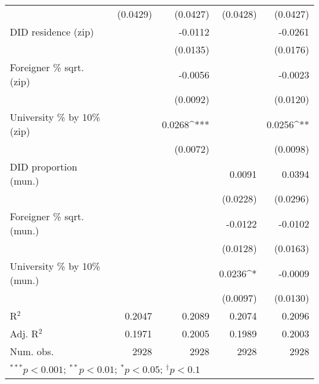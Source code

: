 \begin{tabular}{l D{.}{.}{4.11} D{.}{.}{4.11} D{.}{.}{4.11} D{.}{.}{4.11}}
                                  & (0.0429)          & (0.0427)          & (0.0428)          & (0.0427)          \\
DID residence (zip)               &                   & -0.0112           &                   & -0.0261           \\
                                  &                   & (0.0135)          &                   & (0.0176)          \\
Foreigner \% sqrt. (zip)          &                   & -0.0056           &                   & -0.0023           \\
                                  &                   & (0.0092)          &                   & (0.0120)          \\
University \% by 10\% (zip)       &                   & 0.0268^{***}      &                   & 0.0256^{**}       \\
                                  &                   & (0.0072)          &                   & (0.0098)          \\
DID proportion (mun.)             &                   &                   & 0.0091            & 0.0394            \\
                                  &                   &                   & (0.0228)          & (0.0296)          \\
Foreigner \% sqrt. (mun.)         &                   &                   & -0.0122           & -0.0102           \\
                                  &                   &                   & (0.0128)          & (0.0163)          \\
University \% by 10\% (mun.)      &                   &                   & 0.0236^{*}        & -0.0009           \\
                                  &                   &                   & (0.0097)          & (0.0130)          \\
\midrule
R$^2$                             & 0.2047            & 0.2089            & 0.2074            & 0.2096            \\
Adj. R$^2$                        & 0.1971            & 0.2005            & 0.1989            & 0.2003            \\
Num. obs.                         & 2928              & 2928              & 2928              & 2928              \\
\bottomrule
{}
\end{tabular}
